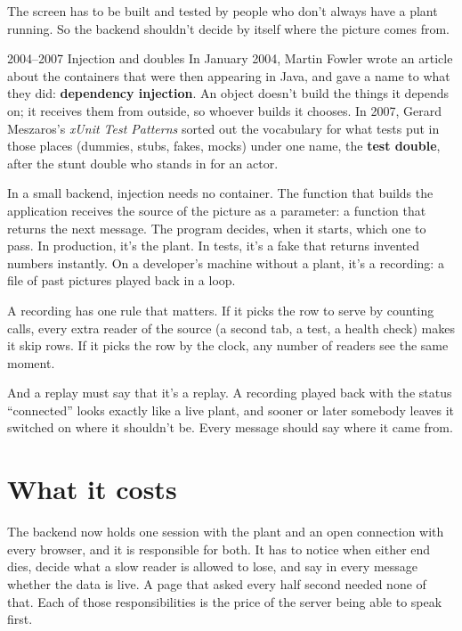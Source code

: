 The screen has to be built and tested by people who don't always have a plant
running. So the backend shouldn't decide by itself where the picture comes
from.

\begin{history}{2004--2007 \textperiodcentered{} Injection and doubles}
In January 2004, Martin Fowler wrote an article about the containers that were
then appearing in Java, and gave a name to what they did: \textbf{dependency
injection}. An object doesn't build the things it depends on; it receives them
from outside, so whoever builds it chooses. In 2007, Gerard Meszaros's
\emph{xUnit Test Patterns} sorted out the vocabulary for what tests put in
those places (dummies, stubs, fakes, mocks) under one name, the \textbf{test
double}, after the stunt double who stands in for an actor.
\end{history}

In a small backend, injection needs no container. The function that builds the
application receives the source of the picture as a parameter: a function that
returns the next message. The program decides, when it starts, which one to
pass. In production, it's the plant. In tests, it's a fake that returns invented
numbers instantly. On a developer's machine without a plant, it's a recording:
a file of past pictures played back in a loop.

A recording has one rule that matters. If it picks the row to serve by counting
calls, every extra reader of the source (a second tab, a test, a health check)
makes it skip rows. If it picks the row by the clock, any number of readers see
the same moment.

And a replay must say that it's a replay. A recording played back with the
status ``connected'' looks exactly like a live plant, and sooner or later
somebody leaves it switched on where it shouldn't be. Every message should say
where it came from.

\section{What it costs}

The backend now holds one session with the plant and an open connection with
every browser, and it is responsible for both. It has to notice when either end
dies, decide what a slow reader is allowed to lose, and say in every message
whether the data is live. A page that asked every half second needed none of
that. Each of those responsibilities is the price of the server being able to
speak first.

